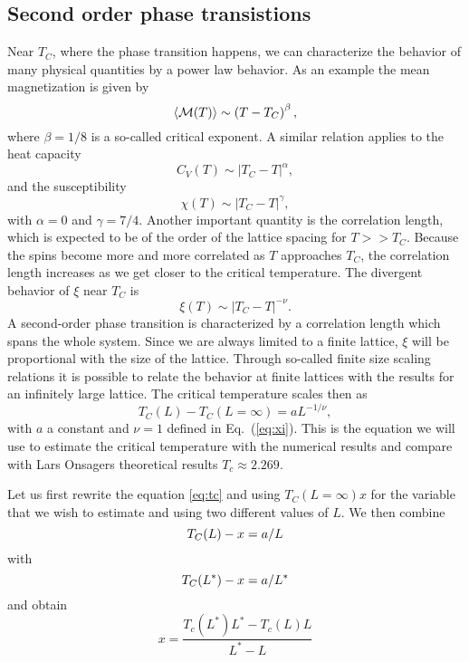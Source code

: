 \documentclass[11pt,a4wide]{article}
\begin{document}
\subsection{Second order phase transistions}
Near $T_C$, where the phase transition happens, we can characterize the behavior of many physical quantities by a power law behavior.
As an example the mean magnetization is given by
\begin{equation}
  \langle {\cal M}(T) \rangle \sim \left(T-T_C\right)^{\beta},
\end{equation}
where $\beta=1/8$ is a so-called critical exponent. A similar relation
applies to the heat capacity 
\begin{equation} 
  C_V(T) \sim \left|T_C-T\right|^{\alpha},
\end{equation}
and the susceptibility
\begin{equation}
  \chi(T) \sim \left|T_C-T\right|^{\gamma},
\end{equation}
with $\alpha = 0$ and $\gamma = 7/4$.
Another important quantity is the correlation length, which is expected
to be of the order of the lattice spacing for $T>> T_C$. Because the spins
become more and more correlated as $T$ approaches $T_C$, the correlation
length increases as we get closer to the critical temperature. The divergent
behavior of $\xi$ near $T_C$ 
is
\begin{equation}
  \xi(T) \sim \left|T_C-T\right|^{-\nu}.
  \label{eq:xi}
\end{equation}
A second-order phase transition is characterized by a
correlation length which spans the whole system.
Since we are always limited to a finite lattice, $\xi$ will
be proportional with the size of the lattice. 
Through so-called finite size scaling relations
it is possible to relate the behavior at finite lattices with the 
results for an infinitely large lattice.
The critical temperature scales then as
\begin{equation}
 T_C(L)-T_C(L=\infty) = aL^{-1/\nu},
 \label{eq:tc}
\end{equation}
with  $a$ a constant and  $\nu=1$ defined in Eq.~(\ref{eq:xi}). This is the equation we will use to estimate the critical temperature with the numerical results and compare with Lars Onsagers theoretical results $T_c \approx 2.269$. 

Let us first rewrite the equation \ref{eq:tc} and using $T_C(L=\infty)x$ for the variable that we wish to estimate and using two different values of $L$. We then combine
\[
 T_C(L)-x = a/L\\
\]
with
\[
 T_C(L^*)-x = a/L^*\\
\]
and obtain
\[
x = \frac{T_c(L^*)L^* - T_c(L)L}{L^* - L}
\]
\end{document}
